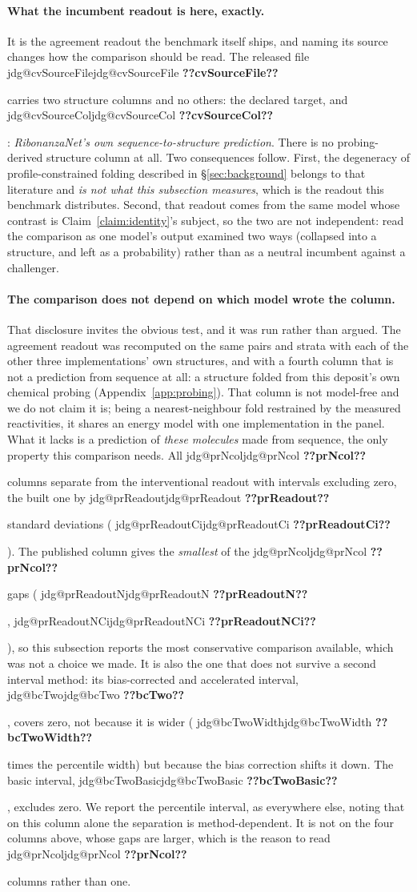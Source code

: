 \documentclass[11pt]{article}
\makeatletter
\newcommand{\jdg}[1]{%
  \ifcsname jdg@#1\endcsname\csname jdg@#1\endcsname
  \else\textbf{??#1??}\PackageError{nm}{undefined measured quantity #1}{}\fi}
\makeatother
\begin{document}
\paragraph{What the incumbent readout is here, exactly.} It is the agreement readout the benchmark
itself ships, and naming its source changes how the comparison should be read. The released file
\jdg{cvSourceFile} carries two structure columns and no others: the declared target, and
\jdg{cvSourceCol}: \emph{RibonanzaNet's own sequence-to-structure prediction}. There is no
probing-derived structure column at all. Two consequences follow. First, the degeneracy of profile-constrained folding described in \S\ref{sec:background} belongs to
that literature and \emph{is not what this subsection measures}, which is the readout this benchmark
distributes. Second, that readout comes from the same model whose contrast is
Claim~\ref{claim:identity}'s subject, so the two are not independent: read the comparison as one
model's output examined two ways (collapsed into a structure, and left as a probability) rather
than as a neutral incumbent against a challenger.

\paragraph{The comparison does not depend on which model wrote the column.} That disclosure
invites the obvious test, and it was run rather than argued. The agreement readout was recomputed
on the same pairs and strata with each of the other three implementations' own structures, and
with a fourth column that is not a prediction from sequence at all: a structure folded from this
deposit's own chemical probing (Appendix~\ref{app:probing}). That column is not model-free and we
do not claim it is; being a nearest-neighbour fold restrained by the measured reactivities, it
shares an energy model with one implementation in the panel. What it lacks is a prediction of \emph{these molecules} made from sequence, the only property this
comparison needs.
All
\jdg{prNcol} columns separate from the interventional readout with intervals excluding zero, the
built one by \jdg{prReadout} standard deviations (\jdg{prReadoutCi}). The published column gives the \emph{smallest} of the \jdg{prNcol} gaps (\jdg{prReadoutN},
\jdg{prReadoutNCi}), so this subsection reports the most conservative comparison available, which
was not a choice we made. It is also the one that does not survive a second interval method: its
bias-corrected and accelerated interval, \jdg{bcTwo}, covers zero, not because it is wider
(\jdg{bcTwoWidth} times the percentile width) but because the bias correction shifts it down. The basic interval,
\jdg{bcTwoBasic}, excludes zero. We report the percentile interval, as everywhere else, noting that on this column alone the
separation is method-dependent. It is not on the four columns above, whose gaps are larger, which is
the reason to read \jdg{prNcol} columns rather than one.
\end{document}
